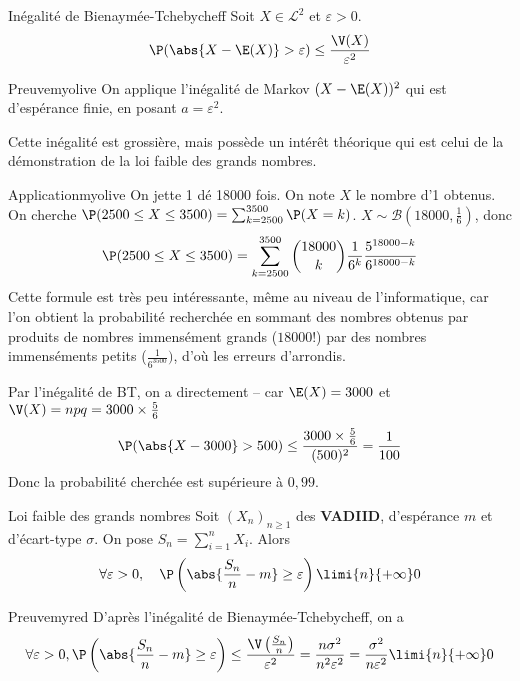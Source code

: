     \begin{prop}{Inégalité de Bienaymée-Tchebycheff}{}
        Soit $X \in \mathcal{L}^2$ et $\varepsilon > 0$.
        \[ \P(\abs{X - \E(X)} > \varepsilon) \leq \frac{\V(X)}{\varepsilon^2} \]   
    \end{prop}

    \begin{demo}{Preuve}{myolive}
        On applique l’inégalité de Markov $(X - \E(X))^2$ qui est d’espérance finie, en posant $a = \varepsilon^2$.
    \end{demo}

    Cette inégalité est grossière, mais possède un intérêt théorique qui est celui de la démonstration de la loi faible des grands nombres. 

    \begin{omed}{Application}{myolive}
        On jette 1 dé 18000 fois. On note $X$ le nombre d’1 obtenus. On cherche $\P(2500 \leq X \leq 3500) = \sum_{k=2500}^{3500} \P(X = k)$. $X \sim \mathcal{B}(18000,\frac{1}{6})$, donc 
        \begin{align*}
            \P(2500 \leq X \leq 3500) = \sum_{k=2500}^{3500} \binom{18000}{k} \frac{1}{6^k} \frac{5^{18000-k}}{6^{18000-k}}
        \end{align*}
        Cette formule est très peu intéressante, même au niveau de l’informatique, car l’on obtient la probabilité recherchée en sommant des nombres obtenus par produits de nombres immensément grands ($18 000!$) par des nombres immenséments petits ($\frac{1}{6^{3500}})$, d’où les erreurs d’arrondis.

        Par l’inégalité de BT, on a directement -- car $\E(X) = 3000$ et $\V(X) = npq = 3000 \times \frac{5}{6}$
        \[ \P(\abs{X - 3000} > 500 ) \leq \frac{3000 \times \frac{5}{6}}{(500)^2}  = \frac{1}{100} \]
        Donc la probabilité cherchée est supérieure à $0,99$.
    \end{omed}
    
    \begin{theo}{Loi faible des grands nombres}{}
        Soit $(X_n)_{n \geq 1}$ des \textbf{\textsc{VADIID}}, d’espérance $m$ et d’écart-type $\sigma$. On pose $S_n = \sum_{i=1}^{n} X_i$. Alors 
        \[ \forall \varepsilon > 0, \quad \P\left(\abs{\frac{S_n}{n} - m} \geq \varepsilon\right) \limi{n}{+\infty} 0 \]    
    \end{theo}

    \begin{demo}{Preuve}{myred}
        D’après l’inégalité de Bienaymée-Tchebycheff, on a 
        \[ \forall \varepsilon > 0, \P\left(\abs{\frac{S_n}{n} - m} \geq \varepsilon\right) \leq \frac{\V\left(\frac{S_n}{n}\right)}{\varepsilon^2} = \frac{n \sigma^2}{n^2 \varepsilon^2} =  \frac{\sigma^2}{n \varepsilon^2} \limi{n}{+\infty} 0 \]   
    \end{demo}

